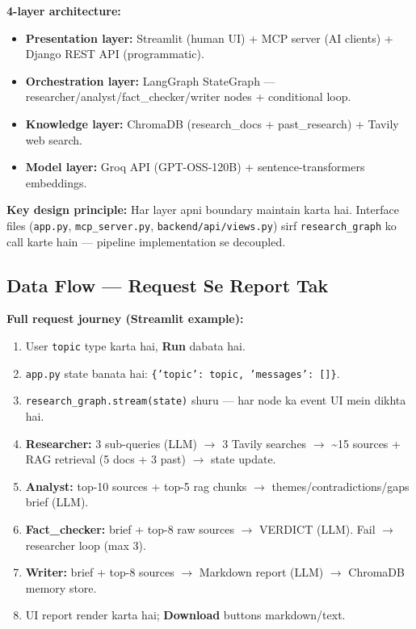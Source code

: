 \begin{designbox}
\textbf{4-layer architecture:}

\begin{itemize}
\item \textbf{Presentation layer:} Streamlit (human UI) + MCP server (AI clients) + Django REST API (programmatic).
\item \textbf{Orchestration layer:} LangGraph StateGraph --- researcher/analyst/fact\_checker/writer nodes + conditional loop.
\item \textbf{Knowledge layer:} ChromaDB (research\_docs + past\_research) + Tavily web search.
\item \textbf{Model layer:} Groq API (GPT-OSS-120B) + sentence-transformers embeddings.
\end{itemize}

\textbf{Key design principle:} Har layer apni boundary maintain karta hai. Interface files (\texttt{app.py}, \texttt{mcp\_server.py}, \texttt{backend/api/views.py}) sirf \texttt{research\_graph} ko call karte hain --- pipeline implementation se decoupled.
\end{designbox}

\subsection{Data Flow --- Request Se Report Tak}

\begin{codestorybox}
\textbf{Full request journey (Streamlit example):}

\begin{enumerate}[label=\arabic*.]
\item User \texttt{topic} type karta hai, \textbf{Run} dabata hai.
\item \texttt{app.py} state banata hai: \texttt{\{'topic': topic, 'messages': []\}}.
\item \texttt{research\_graph.stream(state)} shuru --- har node ka event UI mein dikhta hai.
\item \textbf{Researcher:} 3 sub-queries (LLM) $\rightarrow$ 3 Tavily searches $\rightarrow$ \textasciitilde15 sources + RAG retrieval (5 docs + 3 past) $\rightarrow$ state update.
\item \textbf{Analyst:} top-10 sources + top-5 rag chunks $\rightarrow$ themes/contradictions/gaps brief (LLM).
\item \textbf{Fact\_checker:} brief + top-8 raw sources $\rightarrow$ VERDICT (LLM). Fail $\rightarrow$ researcher loop (max 3).
\item \textbf{Writer:} brief + top-8 sources $\rightarrow$ Markdown report (LLM) $\rightarrow$ ChromaDB memory store.
\item UI report render karta hai; \textbf{Download} buttons markdown/text.
\end{enumerate}
\end{codestorybox}

